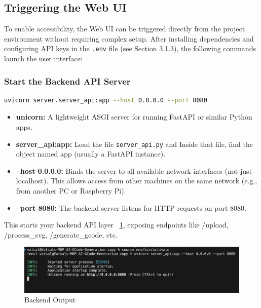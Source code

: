 \subsection{Triggering the Web UI}
To enable accessibility, the Web UI can be triggered directly from the project environment without requiring complex setup. After installing dependencies and configuring API keys in the  \texttt{.env} file (see Section 3.1.3), the following commands launch the user interface:

\subsubsection{Start the Backend API Server}

\begin{lstlisting}[language=bash,caption={Start backend Server}, label={lst:backend}]
uvicorn server.server_api:app --host 0.0.0.0 --port 8080
\end{lstlisting}

\begin{itemize}
	\item \textbf{unicorn:} A lightweight ASGI server for running FastAPI or similar Python apps.
	\item \textbf{server\_api:app:} Load the file \texttt{server\_api.py} and Inside that file, find the object named app (usually a FastAPI instance).
	\item \textbf{--host 0.0.0.0:} Binds the server to all available network interfaces (not just localhost). This allows access from other machines on the same network (e.g., from another PC or Raspberry Pi).
	\item \textbf{--port 8080:} The backend server listens for HTTP requests on port 8080.
\end{itemize}
This starts your backend API layer ~\ref{unicorn}, exposing endpoints like /upload, /process\_svg, /generate\_gcode, etc.

\begin{figure}
	\begin{center}
		\includegraphics[width=1\linewidth]{Images/unicorn.png}
		\caption{Backend Output}
		\label{unicorn} 
	\end{center}
\end{figure}


